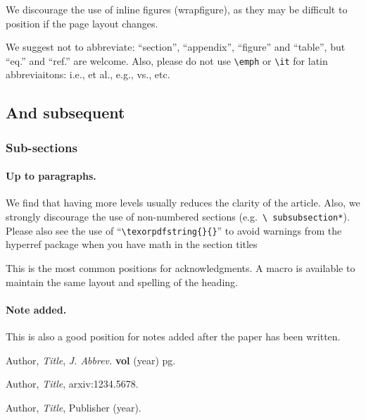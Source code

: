 \documentclass[a4paper,11pt]{article}
\begin{document}
We discourage the use of inline figures (wrapfigure), as they may be
difficult to position if the page layout changes.

We suggest not to abbreviate: ``section'', ``appendix'', ``figure''
and ``table'', but ``eq.'' and ``ref.'' are welcome. Also, please do
not use \texttt{\textbackslash emph} or \texttt{\textbackslash it} for
latin abbreviaitons: i.e., et al., e.g., vs., etc.

\subsection{And subsequent}
\subsubsection{Sub-sections}
\paragraph{Up to paragraphs.} We find that having more levels usually
reduces the clarity of the article. Also, we strongly discourage the
use of non-numbered sections (e.g.~\texttt{\textbackslash
subsubsection*}).  Please also see the use of
``\texttt{\textbackslash texorpdfstring\{\}\{\}}'' to avoid warnings
from the hyperref package when you have math in the section titles

\acknowledgments

This is the most common positions for acknowledgments. A macro is
available to maintain the same layout and spelling of the heading.

\paragraph{Note added.} This is also a good position for notes added
after the paper has been written.






\begin{thebibliography}{99}

Author, \emph{Title}, \emph{J. Abbrev.} {\bf vol} (year) pg.

Author, \emph{Title},
arxiv:1234.5678.

Author, \emph{Title},
Publisher (year).





\end{thebibliography}
\end{document}
